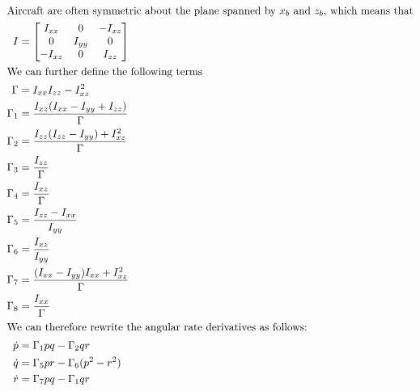 \documentclass{article}
\begin{document}
\begin{align*}
  \intertext{Aircraft are often symmetric about the plane spanned by $x_b$ and
    $z_b$, which means that} I &= \begin{bmatrix} I_{xx} & 0 & -I_{xz} \\
    0 & I_{yy} & 0 \\
    -I_{xz} & 0 & I_{zz} \end{bmatrix} \\
  \intertext{We can further define the following terms}
  \Gamma &= I_{xx}I_{zz} - I_{xz}^2 \\
  \Gamma_1 &= \frac{I_{xz}(I_{xx} - I_{yy} +I_{zz})}{\Gamma} \\
  \Gamma_2 &= \frac{I_{zz}(I_{zz} - I_{yy}) +I_{xz}^2}{\Gamma} \\
  \Gamma_3 &= \frac{I_{zz}}{\Gamma}\\
  \Gamma_4 &= \frac{I_{xz}}{\Gamma}\\
  \Gamma_5 &= \frac{I_{zz}-I_{xx}}{I_{yy}}\\
  \Gamma_6 &= \frac{I_{xz}}{I_{yy}}\\
  \Gamma_7 &= \frac{(I_{xx}-I_{yy})I_{xx}+I_{xz}^2}{\Gamma}\\
  \Gamma_8 &= \frac{I_{xx}}{\Gamma} \\
  \intertext{We can therefore rewrite the angular rate derivatives
    as follows:}
  \dot{p} &= \Gamma_1 pq - \Gamma_2 qr  \\
  \dot{q} &= \Gamma_5 pr - \Gamma_6 (p^2-r^2) \\
  \dot{r} &= \Gamma_7 pq - \Gamma_1 qr  \\
  \end{align*}
\end{document}
